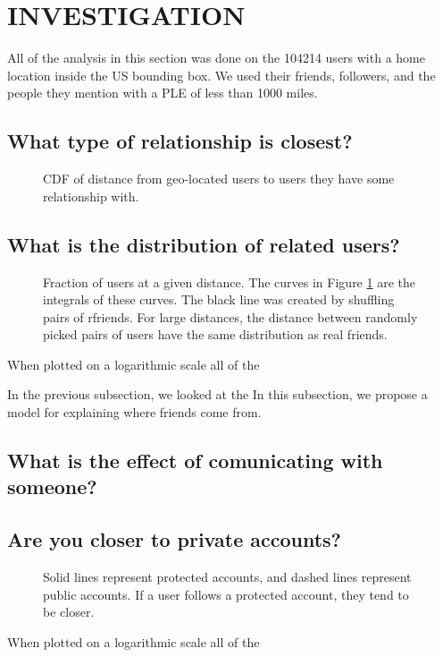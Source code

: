 \documentclass{sig-alternate}
\begin{document}
\section{INVESTIGATION}
All of the analysis in this section was done on the 104214 users with a home location inside the US bounding box. We used their friends, followers, and the people they mention with a PLE of less than 1000 miles.

\subsection{What type of relationship is closest?}
\begin{figure}
\centering
{}
\caption{
CDF of distance from geo-located users to users they have some relationship
with.
}
\label{fig:EdgeTypesCum}
\end{figure}


\subsection{What is the distribution of related users?}
\begin{figure}
\centering
{}
\caption{
Fraction of users at a given distance. The curves in Figure
\ref{fig:EdgeTypesCum} are the integrals of these curves. The black line was created by shuffling pairs of rfriends.  For large distances, the distance between randomly picked pairs of users have the same distribution as real friends.
}
\label{fig:EdgeTypes}
\end{figure}
When plotted on a logarithmic scale all of the 


In the previous subsection, we looked at the 
In this subsection, we propose a model for explaining where friends come from.

\subsection{What is the effect of comunicating with someone?}

\subsection{Are you closer to private accounts?}
\begin{figure}
\centering
{}
\caption{ Solid lines represent protected accounts, and dashed lines represent
public accounts. If a user follows a protected account, they tend to be closer.}
\label{fig:EdgeTypesProt}
\end{figure}
When plotted on a logarithmic scale all of the 
\end{document}
